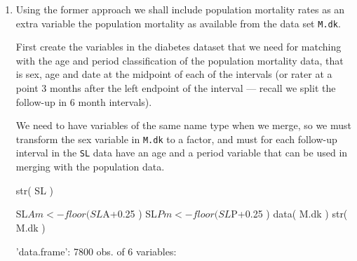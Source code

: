 \begin{enumerate}[resume]


\item Using the former approach we shall include population mortality
  rates as an extra variable the population mortality as available
  from the data set \texttt{M.dk}.

  First create the variables in the diabetes dataset that we need for
  matching with the age and period classification of the population
  mortality data, that is sex, age and date at the midpoint of each of
  the intervals (or rater at a point 3 months after the left endpoint
  of the interval --- recall we split the follow-up in 6 month
  intervals).

  We need to have variables of the same name type when we merge, so we must
  transform the sex variable in \texttt{M.dk} to a factor, and must
  for each follow-up interval in the \texttt{SL} data have an age and
  a period variable that can be used in merging with the population data. 
\begin{Schunk}
\begin{Sinput}
 str( SL )
\end{Sinput}
\begin{Sinput}
 SL$Am <- floor( SL$A+0.25 )
 SL$Pm <- floor( SL$P+0.25 )
 data( M.dk )
 str( M.dk )
\end{Sinput}
\begin{Soutput}
'data.frame':	7800 obs. of  6 variables:

\end{Soutput}
\end{Schunk}
\end{enumerate}
